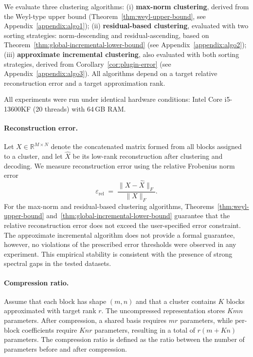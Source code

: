 \documentclass[10pt]{article} %
\begin{document}
We evaluate three clustering algorithms: (i) \textbf{max-norm clustering}, derived from the Weyl-type upper bound (Theorem~\ref{thm:weyl-upper-bound}, see Appendix~\ref{appendix:algo1}); (ii) \textbf{residual-based clustering}, evaluated with two sorting strategies: norm-descending and residual-ascending, based on Theorem~\ref{thm:global-incremental-lower-bound} (see Appendix~\ref{appendix:algo2}); (iii) \textbf{approximate incremental clustering}, also evaluated with both sorting strategies, derived from Corollary~\ref{cor:plugin-error} (see Appendix~\ref{appendix:algo3}). All algorithms depend on a target relative reconstruction error and a target approximation rank.

All experiments were run under identical hardware conditions: Intel Core i5-13600KF (20 threads) with 64\,GB RAM.

\paragraph{Reconstruction error.}
Let \(X \in \mathbb{R}^{M \times N}\) denote the concatenated matrix formed from all blocks assigned to a cluster, and let \(\hat X\) be its low-rank reconstruction after clustering and decoding.
We measure reconstruction error using the relative Frobenius norm error
\begin{equation}
\varepsilon_{\mathrm{rel}} \;=\;
\frac{\lVert X - \hat X \rVert_F}{\lVert X \rVert_F}.
\end{equation}
For the max-norm and residual-based clustering algorithms, Theorems~\ref{thm:weyl-upper-bound} and~\ref{thm:global-incremental-lower-bound} guarantee that the relative reconstruction error does not exceed the user-specified error constraint.
The approximate incremental algorithm does not provide a formal guarantee, however, no violations of the prescribed error thresholds were observed in any experiment. This empirical stability is consistent with the presence of strong spectral gaps in the tested datasets.

\paragraph{Compression ratio.}
Assume that each block has shape \((m,n)\) and that a cluster contains \(K\) blocks approximated with target rank \(r\).
The uncompressed representation stores \(Kmn\) parameters.
After compression, a shared basis requires \(mr\) parameters, while per-block coefficients require \(Knr\) parameters, resulting in a total of
\(
r(m + Kn)
\)
parameters.
The compression ratio is defined as the ratio between the number of parameters before and after compression.
\end{document}
